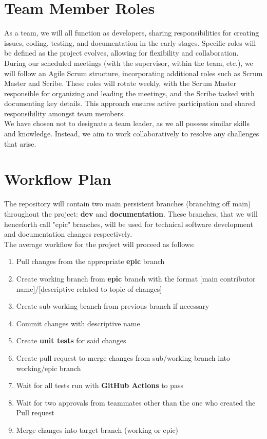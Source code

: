 \documentclass{article}
\begin{document}
\section{Team Member Roles}

\hspace{\parindent}As a team, we will all function as developers, sharing responsibilities
for creating issues, coding, testing, and documentation in the early stages. Specific roles
will be defined as the project evolves, allowing for flexibility and collaboration. \\

During our scheduled meetings (with the supervisor, within the team, etc.), we will follow
an Agile Scrum structure, incorporating additional roles such as Scrum Master and Scribe.
These roles will rotate weekly, with the Scrum Master responsible for organizing and leading
the meetings, and the Scribe tasked with documenting key details. This approach ensures active
participation and shared responsibility amongst team members. \\

We have chosen not to designate a team leader, as we all possess similar skills and knowledge.
Instead, we aim to work collaboratively to resolve any challenges that arise.

\section{Workflow Plan}

\hspace{\parindent}The repository will contain two main persistent branches (branching off main) throughout the project:
\textbf{dev} and \textbf{documentation}. These branches, that we will henceforth call "epic" branches, will be used for technical
software development and documentation changes respectively. \\

The average workflow for the project will proceed as follows:
\begin{enumerate}
  \item Pull changes from the appropriate \textbf{epic} branch
  \item Create working branch from \textbf{epic} branch with the format [main contributor name]/[descriptive related to topic of changes]
  \item Create sub-working-branch from previous branch if necessary
  \item Commit changes with descriptive name
  \item Create \textbf{unit tests} for said changes
  \item Create pull request to merge changes from sub/working branch into working/epic branch
  \item Wait for all tests run with \textbf{GitHub Actions} to pass
  \item Wait for two approvals from teammates other than the one who created the Pull request
  \item Merge changes into target branch (working or epic)
\end{enumerate}
\end{document}
